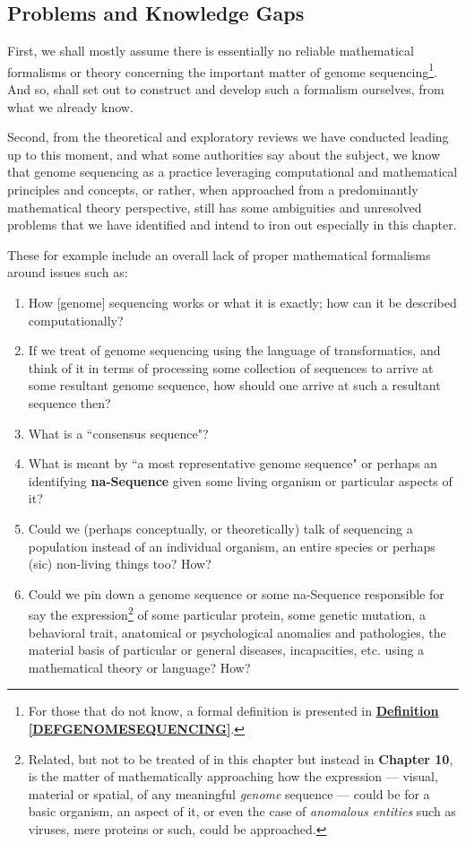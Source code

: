\documentclass[a4paper, 18pt]{article} %
\begin{document}
\subsection{Problems and Knowledge Gaps}


First, we shall mostly assume there is essentially no reliable mathematical formalisms or theory concerning the important matter of genome sequencing\footnote{For those that do not know, a formal definition is presented in \textbf{\hyperref[DEFGENOMESEQUENCING]{Definition \ref{DEFGENOMESEQUENCING}}}.}. And so, shall set out to construct and develop such a formalism ourselves, from what we already know.

Second, from the theoretical and exploratory reviews we have conducted leading up to this moment, and what some authorities\cite{przytycka_wgs_lecture10} say about the subject, we know that genome sequencing as a practice leveraging computational and mathematical principles and concepts, or rather, when approached from a predominantly mathematical theory perspective, still has some ambiguities and unresolved problems that we have identified and intend to iron out especially in this chapter.

These for example include an overall lack of proper mathematical formalisms around  issues such as:

\begin{enumerate}
\item How [genome] sequencing works or what it is exactly; how can it be described computationally?
\item If we treat of genome sequencing using the language of transformatics, and think of it in terms of processing some collection of sequences to arrive at some resultant genome sequence, how should one arrive at such a resultant sequence then? 
\item What is a ``consensus sequence"\cite{przytycka_wgs_lecture10}?
\item What is meant by ``a most representative genome sequence" or perhaps an identifying \textbf{na-Sequence} given some living organism or particular aspects of it?
\item Could we (perhaps conceptually, or theoretically) talk of sequencing a population instead of an individual organism, an entire species or perhaps (sic) non-living things too? How?
\item Could we pin down a genome sequence or some na-Sequence responsible for say the expression\footnote{Related, but not to be treated of in this chapter but instead in \textbf{Chapter 10}\cite{lutalo_2025_trans_genetics}, is the matter of mathematically approaching how the expression --- visual, material or spatial, of any meaningful \textit{genome} sequence --- could be for a basic organism, an aspect of it, or even the case of \textit{anomalous entities} such as viruses, mere proteins or such, could be approached.} of some particular protein, some genetic mutation, a behavioral trait, anatomical or psychological anomalies and pathologies, the material basis of particular or general diseases, incapacities, etc. using a mathematical theory or language? How?
\end{enumerate}
\end{document}
